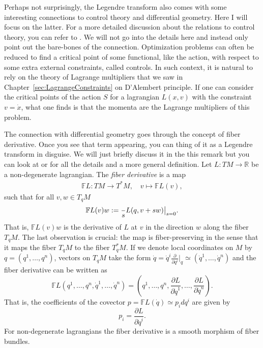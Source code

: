 \documentclass[english,fontsize=11pt,paper=a5,oneside]{scrbook}
\newcommand{\R}{\mathbb{R}}
\let\d\relax
\newcommand{\d}{\mathrm{d}}
\theoremstyle{definition}
\newenvironment{remark}
  {\pushQED{\qed}\renewcommand{\qedsymbol}{$\lozenge$}\remarkx}
  {\popQED\endremarkx}
\begin{document}
\begin{remark}
  Perhaps not surprisingly, the Legendre transform also comes with some interesting connections to control theory and differential geometry.
  Here I will focus on the latter. For a more detailed discussion about the relations to control theory, you can refer to \cite[Appendix II]{book:gelfand}.
  We will not go into the details here and instead only point out the bare-bones of the connection.
  Optimization problems can often be reduced to find a critical point of some functional, like the action, with respect to some extra external constraints, called controls.
  In such context, it is natural to rely on the theory of Lagrange multipliers that we saw in Chapter~\ref{sec:LagrangeConstraints} on D'Alembert principle.
  If one can consider the critical points of the action $S$ for a lagrangian $L(x,v)$ with the constraint $v=\dot x$, what one finds is that the momenta are the Lagrange multipliers of this problem.

  The connection with differential geometry goes through the concept of fiber derivative. Once you see that term appearing, you can thing of it as a Legendre transform in disguise. We will just briefly discuss it in the this remark but you can look at \cite[Chapter 7.2]{book:marsdenratiu} or \cite[Chapter 3.5]{book:amr} for all the details and a more general definition.
  Let $L:TM \to \R$ be a non-degenerate lagrangian. The \emph{fiber derivative} is a map
  \begin{align}
    \mathbb{F}L : TM \to T^*M, \quad v \mapsto \mathbb{F}L(v),
  \end{align}
  such that for all $v,w \in T_q M$
  \begin{align}
    \mathbb{F}L(v) w := \frac{\d}{\d s} L(q, v + s w) \big|_{s=0}.
  \end{align}
  That is, $\mathbb{F}L(v) w$ is the derivative of $L$ at $v$ in the direction $w$ along the fiber $T_qM$.
  The last observation is crucial: the map is fiber-preserving in the sense that it maps the fiber $T_qM$ to the fiber $T^*_qM$.
  If we denote local coordinates on $M$ by $q=(q^1, \ldots, q^n)$, vectors on $T_qM$ take the form $\dot q = \dot q^i \frac{\partial}{\partial q^i}\big|_q \simeq (\dot q^1, \ldots, \dot q^n)$ and the fiber derivative can be written as
  \begin{equation}
    \mathbb{F}L(q^1, \ldots, q^n, \dot q^1, \ldots,\dot q^n) = \left(q^1, \ldots, q^n, \frac{\partial L}{\partial \dot q^1}, \ldots, \frac{\partial L}{\partial \dot q^n}\right).
  \end{equation}
  That is, the coefficients of the covector $p = \mathbb{F}L(\dot q) \simeq p_i dq^i$ are given by
  \begin{equation}
    p_i = \frac{\partial L}{\partial \dot q^i}.
  \end{equation}
  For non-degenerate lagrangians the fiber derivative is a smooth morphism of fiber bundles.


\end{remark}
\end{document}
